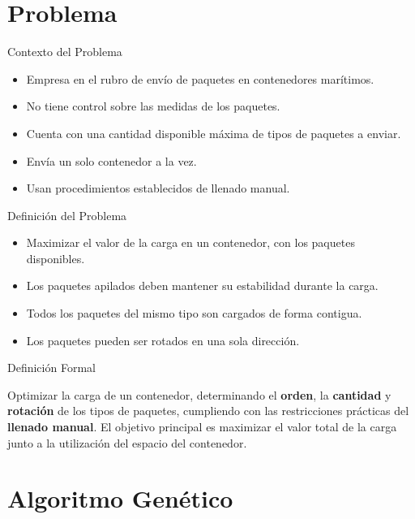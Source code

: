 \documentclass{beamer}
\begin{document}
\section{Problema}

\begin{frame}{Contexto del Problema}
    \begin{itemize}[<+-| alert@+>]
        \item Empresa en el rubro de envío de paquetes en contenedores marítimos.
        \item No tiene control sobre las medidas de los paquetes.
        \item Cuenta con una cantidad disponible máxima de tipos de paquetes a enviar.
        \item Envía un solo contenedor a la vez.
        \item Usan procedimientos establecidos de llenado manual.
    \end{itemize}
\end{frame}

\begin{frame}{Definición del Problema}
    \begin{itemize}[<+-| alert@+>]
        \item Maximizar el valor de la carga en un contenedor, con los paquetes disponibles.
        \item Los paquetes apilados deben mantener su estabilidad durante la carga.
        \item Todos los paquetes del mismo tipo son cargados de forma contigua.
        \item Los paquetes pueden ser rotados en una sola dirección.
    \end{itemize}
\end{frame}

\begin{frame}{Definición Formal}
    \begin{center}
        Optimizar la carga de un contenedor, determinando el \textbf{\textcolor{ritsumeikan}{orden}}, la \textbf{\textcolor{ritsumeikan}{cantidad}} y  \textbf{\textcolor{ritsumeikan}{rotación}} de los tipos de paquetes, cumpliendo con las restricciones prácticas del \textbf{\textcolor{ritsumeikan}{llenado manual}}. El objetivo principal es maximizar el valor total de la carga junto a la utilización del espacio del contenedor.
    \end{center}
\end{frame}

\section{Algoritmo Genético}
\end{document}

